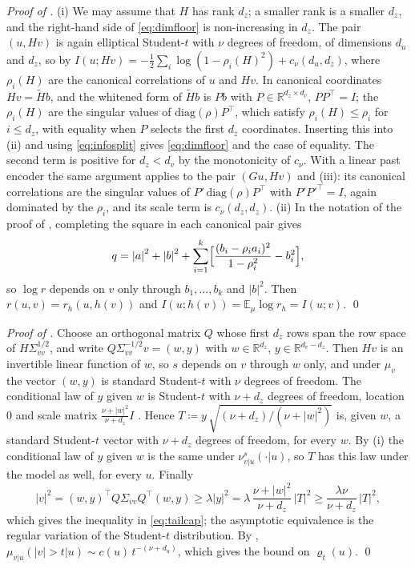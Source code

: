 \documentclass[11pt]{article}
\theoremstyle{plain}
\theoremstyle{definition}
\theoremstyle{remark}
\newcommand{\RR}{\mathbb{R}}
\newcommand{\E}{\mathbb{E}}
\newcommand{\define}{\coloneqq}
\newcommand{\abs}[1]{\left\lvert #1 \right\rvert}
\begin{document}
\smallskip
\noindent\emph{Proof of .}
(i) We may assume that $H$ has rank $d_z$; a smaller rank is a smaller
$d_z$, and the right-hand side of \eqref{eq:dimfloor} is non-increasing in
$d_z$. The pair $(u,Hv)$ is again elliptical Student-$t$ with $\nu$ degrees
of freedom, of dimensions $d_u$ and $d_z$, so by 
$I(u;Hv)=-\tfrac12\sum_i\log(1-\rho_i(H)^{2})+c_\nu(d_u,d_z)$, where
$\rho_i(H)$ are the canonical correlations of $u$ and $Hv$. In canonical
coordinates $Hv=\tilde H b$, and the whitened form of $\tilde Hb$ is $Pb$ with
$P\in\RR^{d_z\times d_v}$, $PP^{\top}=I$; the $\rho_i(H)$ are the singular
values of $\mathrm{diag}(\rho)P^{\top}$, which satisfy
$\rho_i(H)\le\rho_i$ for $i\le d_z$, with equality when $P$ selects the first
$d_z$ coordinates. Inserting this into (ii) and using
\eqref{eq:infosplit} gives \eqref{eq:dimfloor} and the case of equality. The
second term is positive for $d_z<d_v$ by the monotonicity of $c_\nu$. With a
linear past encoder the same argument applies to the pair $(Gu,Hv)$ and
(iii): its canonical correlations are the singular
values of $P'\,\mathrm{diag}(\rho)P^{\top}$ with $P'P'^{\top}=I$, again
dominated by the $\rho_i$, and its scale term is $c_\nu(d_z,d_z)$.
(ii) In the notation of the proof of , completing the
square in each canonical pair gives
\begin{equation*}
 q=\abs{a}^{2}+\abs{b}^{2}+\sum_{i=1}^{k}\Bigl[\frac{(b_i-\rho_ia_i)^{2}}{1-\rho_i^{2}}-b_i^{2}\Bigr],
\end{equation*}
so $\log r$ depends on $v$ only through $b_1,\dots,b_k$ and $\abs{b}^{2}$.
Then $r(u,v)=r_h(u,h(v))$ and $I(u;h(v))=\E_\mu\log r_h=I(u;v)$.
\qed

\smallskip
\noindent\emph{Proof of .}
Choose an orthogonal matrix $Q$ whose first $d_z$ rows span the row space of
$H\Sigma_{vv}^{1/2}$, and write $Q\Sigma_{vv}^{-1/2}v=(w,y)$ with
$w\in\RR^{d_z}$, $y\in\RR^{d_v-d_z}$. Then $Hv$ is an invertible linear
function of $w$, so $s$ depends on $v$ through $w$ only, and under $\mu_v$
the vector $(w,y)$ is standard Student-$t$ with $\nu$ degrees of freedom. The
conditional law of $y$ given $w$ is Student-$t$ with $\nu+d_z$ degrees of
freedom, location $0$ and scale matrix $\frac{\nu+\abs{w}^{2}}{\nu+d_z}I$
\cite{kotz2004multivariate}. Hence
$T\define y\,\sqrt{(\nu+d_z)/(\nu+\abs{w}^{2})}$ is, given $w$, a standard
Student-$t$ vector with $\nu+d_z$ degrees of freedom, for every $w$. By
(i) the conditional law of $y$ given $w$ is the same
under $\nu^{s}_{v\vert u}(\cdot\vert u)$, so $T$ has this law under the model
as well, for every $u$. Finally
\begin{equation*}
 \abs{v}^{2}=(w,y)^{\top}Q\Sigma_{vv}Q^{\top}(w,y)\ge\lambda\abs{y}^{2}
 =\lambda\,\frac{\nu+\abs{w}^{2}}{\nu+d_z}\,\abs{T}^{2}\ge\frac{\lambda\nu}{\nu+d_z}\,\abs{T}^{2},
\end{equation*}
which gives the inequality in \eqref{eq:tailcap}; the asymptotic
equivalence is the regular variation of the Student-$t$ distribution. By
,
$\mu_{v\vert u}(\abs{v}>t\vert u)\sim c(u)\,t^{-(\nu+d_u)}$, which gives the
bound on $\varrho_t(u)$.
\qed
\end{document}
